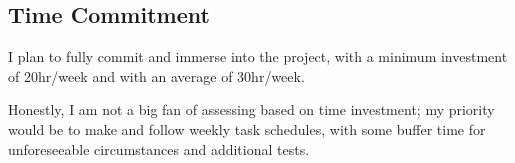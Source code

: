 \subsection{Time Commitment}
    I plan to fully commit and immerse into the project, with a minimum investment of 20hr/week and with an average of 30hr/week. 
    
    Honestly, I am not a big fan of assessing based on time investment; my priority would be to make and follow weekly task schedules, with some buffer time for unforeseeable circumstances and additional tests.

